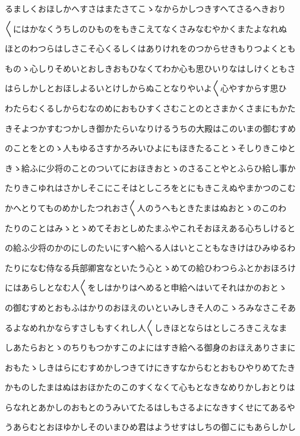 \documentclass[a4paper,11pt,landscape]{ltjtarticle}
\begin{document}
るましくおほしかへすさはまたさてこゝなからかしつきすへてさるへきおり
\par\medskip
〱にはかなくうちしのひものをもきこえてなくさみなむやかくまたよなれぬ
\par\medskip
ほとのわつらはしさこそ心くるしくはありけれをのつからせきもりつよくとも
\par\medskip
ものゝ心しりそめいとおしきおもひなくてわか心も思ひいりなはしけくともさ
\par\medskip
はらしかしとおほしよるいとけしからぬことなりやいよ〱心やすからす思ひ
\par\medskip
わたらむくるしからむなのめにおもひすくさむことのとさまかくさまにもかた
\par\medskip
きそよつかすむつかしき御かたらいなりけるうちの大殿はこのいまの御むすめ
\par\medskip
のことをとのゝ人もゆるさすかろみいひよにもほきたることゝそしりきこゆと
\par\medskip
きゝ給ふに少将のことのついてにおほきおとゝのさることやとふらひ給し事か
\par\medskip
たりきこゆれはさかしそこにこそはとしころをとにもきこえぬやまかつのこむ
\par\medskip
かへとりてものめかしたつれおさ〱人のうへもときたまはぬおとゝのこのわ
\par\medskip
たりのことはみゝとゝめてそおとしめたまふやこれそおほえある心ちしけると
\par\medskip
の給ふ少将のかのにしのたいにすへ給へる人はいとこともなきけはひみゆるわ
\par\medskip
たりになむ侍なる兵部卿宮なといたう心とゝめての給ひわつらふとかおほろけ
\par\medskip
にはあらしとなむ人〱をしはかりはへめると申給へはいてそれはかのおとゝ
\par\medskip
の御むすめとおもふはかりのおほえのいといみしきそ人のこゝろみなさこそあ
\par\medskip
るよなめれかならすさしもすくれし人〱しきほとならはとしころきこえなま
\par\medskip
しあたらおとゝのちりもつかすこのよにはすき給へる御身のおほえありさまに
\par\medskip
おもたゝしきはらにむすめかしつきてけにきすなからむとおもひやりめてたき
\par\medskip
かものしたまはぬはおほかたのこのすくなくて心もとなきなめりかしおとりは
\par\medskip
らなれとあかしのおもとのうみいてたるはしもさるよになきすくせにてあるや
\par\medskip
うあらむとおほゆかしそのいまひめ君はようせすはしちの御こにもあらしかし
\end{document}
